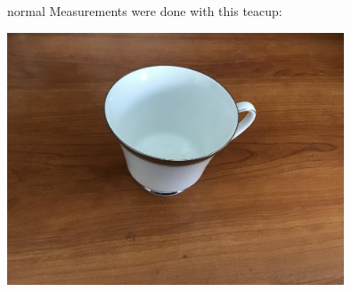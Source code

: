\begin{solution}{normal}
\noindent Measurements were done with this teacup:
\begin{center}
    \includegraphics[width=10cm]{teacup.jpg}
\end{center}


\end{solution}
